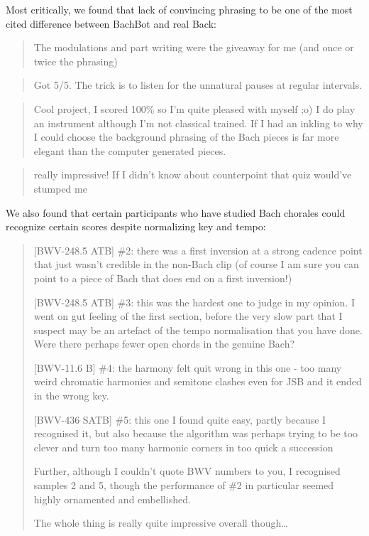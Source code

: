 Most critically, we found that lack of convincing phrasing to be one of the most
cited difference between BachBot and real Back:

\begin{quote}
  The modulations and part writing were the giveaway for me (and once or twice the phrasing)
\end{quote}

\begin{quote}
  Got 5/5. The trick is to listen for the unnatural pauses at regular intervals.
\end{quote}

\begin{quote}
  Cool project, I scored 100\% so I'm quite pleased with myself ;o) I do
  play an instrument although I'm not classical trained. If I had an
  inkling to why I could choose the background phrasing of the Bach
  pieces is far more elegant than the computer generated pieces.
\end{quote}


\begin{quote}
  really impressive! If I didn't know about counterpoint that quiz would've stumped me
\end{quote}

We also found that certain participants who have studied Bach chorales could recognize
certain scores despite normalizing key and tempo:
\begin{quote}
  [BWV-248.5 ATB]
  \#2: there was a first inversion at a strong cadence point that just wasn't
  credible in the non-Bach clip (of course I am sure you can point to a piece
  of Bach that does end on a first inversion!)

  [BWV-248.5 ATB]
  \#3: this was the hardest one to judge in my opinion. I went on gut feeling
  of the first section, before the very slow part that I suspect may be an
  artefact of the tempo normalisation that you have done. Were there perhaps
  fewer open chords in the genuine Bach?

  [BWV-11.6 B]
  \#4: the harmony felt quit wrong in this one - too many weird chromatic
  harmonies and semitone clashes even for JSB and it ended in the wrong key.

  [BWV-436 SATB]
  \#5: this one I found quite easy, partly because I recognised it, but also
  because the algorithm was perhaps trying to be too clever and turn too many
  harmonic corners in too quick a succession

  Further, although I couldn't quote BWV numbers to you, I recognised samples 2
  and 5, though the performance of \#2 in particular seemed highly ornamented
  and embellished.

  The whole thing is really quite impressive overall though\ldots
\end{quote}

